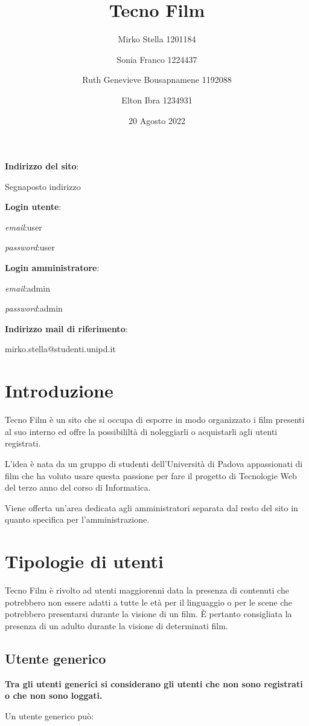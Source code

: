 \documentclass[a4paper]{article}
\author{Mirko Stella 1201184 \and Sonia Franco 1224437 \and Ruth Genevieve Bousapnamene 1192088 \and Elton Ibra 1234931}
\title{\Huge \textbf {Tecno Film}}
\date{20 Agosto 2022}
\begin{document}
\maketitle
\textbf{Indirizzo del sito}:

Segnaposto indirizzo

\textbf{Login utente}:

\textit{email}:user 

\textit{password}:user
 
\textbf{Login amministratore}:

\textit{email}:admin 

\textit{password}:admin

\textbf{Indirizzo mail di riferimento}:

mirko.stella@studenti.unipd.it

\tableofcontents
\newpage
\section{Introduzione}
Tecno Film \`e un sito che si occupa di esporre in modo organizzato i film presenti al suo interno ed offre la possibililt\`a di noleggiarli o acquistarli agli utenti registrati.

L'idea \`e nata da un gruppo di studenti dell'Universit\`a di Padova appassionati di film che ha voluto usare questa 
passione per fare il progetto di Tecnologie Web del terzo anno del corso di Informatica.

Viene offerta un'area dedicata agli amministratori separata dal resto del sito in quanto specifica per l'amministrazione.
    \section{Tipologie di utenti}
    Tecno Film \`e rivolto ad utenti maggiorenni data la presenza di contenuti che potrebbero non essere adatti a tutte le et\`a per il linguaggio
    o per le scene che potrebbero presentarsi durante la visione di un film.
\`E pertanto consigliata la presenza di un adulto durante la visione di determinati film.   
\subsection{Utente generico}
\textbf{Tra gli utenti generici si considerano gli utenti che non sono registrati o che non sono loggati.}

Un utente generico pu\`o:
\end{document}

